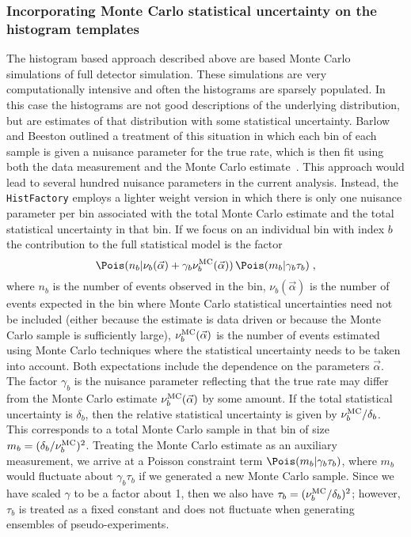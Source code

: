 \subsubsection{Incorporating Monte Carlo statistical uncertainty on the histogram templates}


The histogram based approach described above are based Monte Carlo simulations of full detector simulation.  These simulations are very computationally intensive and often the histograms are sparsely populated.  In this case the histograms are not good descriptions of the underlying distribution, but are estimates of that distribution with some statistical uncertainty.  Barlow and Beeston outlined a treatment of this situation in which each bin of each sample is given a nuisance parameter for the true rate, which is then fit using both the data measurement and the Monte Carlo estimate~\cite{Barlow:1993dm}.  This approach would lead to several hundred nuisance parameters in the current analysis.  Instead, the \texttt{HistFactory} employs a lighter weight version in which there is only one nuisance parameter per bin associated with the total Monte Carlo estimate  and the total statistical uncertainty in that bin.  If we focus on an individual bin with index $b$ the contribution to the full statistical model is the factor
\begin{equation}
\Pois(n_b | \nu_b(\vec\alpha) + \gamma_b \nu_b^{\rm MC}(\vec\alpha)) \,  \Pois(m_b | \gamma_b \tau_b) \;,
\end{equation}
where $n_b$ is the number of events observed in the bin, $\nu_b(\vec\alpha)$ is the number of events expected in the bin where Monte Carlo statistical uncertainties need not be included (either because the estimate is data driven or because the Monte Carlo sample is sufficiently large), $\nu_b^{\rm MC}(\vec\alpha)$ is the number of events estimated using Monte Carlo techniques where the statistical uncertainty needs to be taken into account.  Both expectations include the dependence on the parameters $\vec\alpha$.  The factor $\gamma_b$ is the nuisance parameter reflecting that the true rate may differ from the Monte Carlo estimate $\nu_b^{\rm MC}(\vec\alpha) $ by some amount.  If the total statistical uncertainty is $\delta_b$, then the relative statistical uncertainty is given by $\nu_b^{\rm MC}/\delta_b$.  This corresponds to a total Monte Carlo sample in that bin of size $m_b =  (\delta_b/\nu_b^{\rm MC})^2$.  Treating the Monte Carlo estimate as an auxiliary measurement, we arrive at a Poisson constraint term $ \Pois(m_b | \gamma_b \tau_b)$, where $m_b$ would fluctuate about $\gamma_b \tau_b$ if we generated a new Monte Carlo sample.  Since we have scaled $\gamma$ to be a factor about 1, then we also have $\tau_b=(\nu_b^{\rm MC}/\delta_b)^2$; however, $\tau_b$ is treated as a fixed constant and does not fluctuate when generating ensembles of pseudo-experiments.


